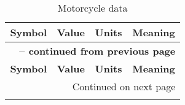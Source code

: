 \begin{longtable}{clcl}
    \caption{Motorcycle data} \label{tab:MotoData} \\
    \hline \multicolumn{1}{c}{\textbf{Symbol}} & \multicolumn{1}{c}{\textbf{Value}} & \multicolumn{1}{c}{\textbf{Units}} & \multicolumn{1}{c}{\textbf{Meaning}} \\ \hline
    \endfirsthead

    \multicolumn{4}{c}{{\bfseries \tablename\ \thetable{} -- continued from previous page}} \\
    \hline \multicolumn{1}{c}{\textbf{Symbol}} & \multicolumn{1}{c}{\textbf{Value}} & \multicolumn{1}{c}{\textbf{Units}} & \multicolumn{1}{c}{\textbf{Meaning}} \\ \hline
    \endhead

    \hline \multicolumn{4}{r}{{Continued on next page}} \\ \hline
    \endfoot


\end{longtable}
